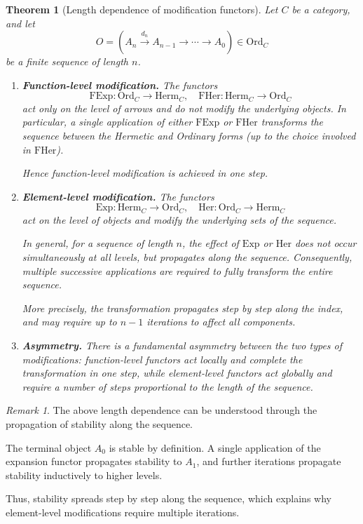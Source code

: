\documentclass[11pt]{book}
\theoremstyle{definition}
\theoremstyle{plain}
\newtheorem{theorem}{Theorem}[section]
\theoremstyle{remark}
\newtheorem*{remark}{Remark}
\begin{document}
\begin{theorem}[Length dependence of modification functors]
Let $C$ be a category, and let
\[
O = (A_n \xrightarrow{d_n} A_{n-1} \to \cdots \to A_0) \in \mathrm{Ord}_C
\]
be a finite sequence of length $n$.

\begin{enumerate}
\item[\textup{(1)}] \textbf{Function-level modification.}
The functors
\[
\mathrm{FExp} : \mathrm{Ord}_C \to \mathrm{Herm}_C,
\quad
\mathrm{FHer} : \mathrm{Herm}_C \to \mathrm{Ord}_C
\]
act only on the level of arrows and do not modify the underlying objects.
In particular, a single application of either $\mathrm{FExp}$ or $\mathrm{FHer}$
transforms the sequence between the Hermetic and Ordinary forms
(up to the choice involved in $\mathrm{FHer}$).

Hence function-level modification is achieved in one step.

\item[\textup{(2)}] \textbf{Element-level modification.}
The functors
\[
\mathrm{Exp} : \mathrm{Herm}_C \to \mathrm{Ord}_C,
\quad
\mathrm{Her} : \mathrm{Ord}_C \to \mathrm{Herm}_C
\]
act on the level of objects and modify the underlying sets of the sequence.

In general, for a sequence of length $n$, the effect of $\mathrm{Exp}$ or $\mathrm{Her}$
does not occur simultaneously at all levels, but propagates along the sequence.
Consequently, multiple successive applications are required to fully transform
the entire sequence.

More precisely, the transformation propagates step by step along the index,
and may require up to $n-1$ iterations to affect all components.

\item[\textup{(3)}] \textbf{Asymmetry.}
There is a fundamental asymmetry between the two types of modifications:
function-level functors act locally and complete the transformation in one step,
while element-level functors act globally and require a number of steps
proportional to the length of the sequence.
\end{enumerate}
\end{theorem}

\begin{remark}
The above length dependence can be understood through the propagation
of stability along the sequence.

The terminal object $A_0$ is stable by definition. A single application
of the expansion functor propagates stability to $A_1$, and further
iterations propagate stability inductively to higher levels.

Thus, stability spreads step by step along the sequence, which explains
why element-level modifications require multiple iterations.
\end{remark}
\end{document}
